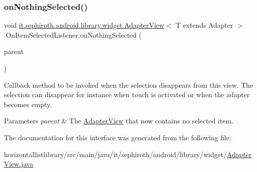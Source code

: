 \subsubsection{\texorpdfstring{on\+Nothing\+Selected()}{onNothingSelected()}}
{\footnotesize\ttfamily void \hyperlink{classit_1_1sephiroth_1_1android_1_1library_1_1widget_1_1_adapter_view}{it.\+sephiroth.\+android.\+library.\+widget.\+Adapter\+View}$<$ T extends Adapter $>$.On\+Item\+Selected\+Listener.\+on\+Nothing\+Selected (\begin{DoxyParamCaption}\item[{\hyperlink{classit_1_1sephiroth_1_1android_1_1library_1_1widget_1_1_adapter_view}{Adapter\+View}$<$?$>$}]{parent }\end{DoxyParamCaption})}

Callback method to be invoked when the selection disappears from this view. The selection can disappear for instance when touch is activated or when the adapter becomes empty.


\begin{DoxyParams}{Parameters}
{\em parent} & The \hyperlink{classit_1_1sephiroth_1_1android_1_1library_1_1widget_1_1_adapter_view}{Adapter\+View} that now contains no selected item. \\
\hline
\end{DoxyParams}


The documentation for this interface was generated from the following file\+:\begin{DoxyCompactItemize}
\item 
horizontallistlibrary/src/main/java/it/sephiroth/android/library/widget/\hyperlink{_adapter_view_8java}{Adapter\+View.\+java}\end{DoxyCompactItemize}
